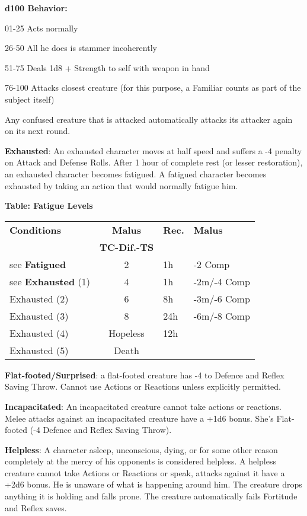 \documentclass[a4paper,12 pt,openany]{book}
\begin{document}
\begin{textblock*}{19 cm}
\begin{multicols}{2}
\textbf{d100 Behavior:}

01-25 Acts normally

26-50 All he does is stammer incoherently

51-75 Deals 1d8 + Strength to self with weapon in hand

76-100 Attacks closest creature (for this purpose, a Familiar counts as part of the subject itself)

Any confused creature that is attacked automatically attacks its attacker again on its next round.

\textbf{Exhausted}: An exhausted character moves at half speed and suffers a -4 penalty on Attack and Defense Rolls. After 1 hour of complete rest (or lesser restoration), an exhausted character becomes fatigued. A fatigued character becomes exhausted by taking an action that would normally fatigue him.

\medskip

\textbf{Table: Fatigue Levels}

\medskip

\begin{tabularx}{0.45\textwidth}{lcll}
\textbf{Conditions}& \textbf{Malus}&\textbf{Rec.}&\textbf{Malus}\\
&\textbf{TC-Dif.-TS}&&\\
\hline
see \textbf{Fatigued}&2&1h&-2 Comp\\
see \textbf{Exhausted} (1)&4&1h&-2m/-4 Comp\\
Exhausted (2) &6&8h&-3m/-6 Comp\\
Exhausted (3) &8&24h&-6m/-8 Comp\\
Exhausted (4) &Hopeless&12h&\\
Exhausted (5) &Death&&\\
\end{tabularx}

\textbf{Flat-footed/Surprised}: a flat-footed creature has -4 to Defence and Reflex Saving Throw. Cannot use Actions or Reactions unless explicitly permitted.

\textbf{Incapacitated}: An incapacitated creature cannot take actions or reactions. Melee attacks against an incapacitated creature have a +1d6 bonus. She's Flat-footed (-4 Defence and Reflex Saving Throw).

\textbf{Helpless}: A character asleep, unconscious, dying, or for some other reason completely at the mercy of his opponents is considered helpless.
A helpless creature cannot take Actions or Reactions or speak, attacks against it have a +2d6 bonus. He is unaware of what is happening around him. The creature drops anything it is holding and falls prone.
The creature automatically fails Fortitude and Reflex saves.


\end{multicols}
\end{textblock*}
\end{document}
